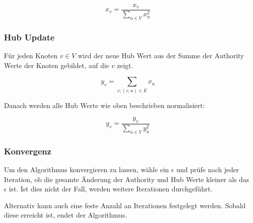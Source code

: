 \[ x_{v} =  \frac{x_{v}}{\sum_{u \in V} x_{u}^{2}} \]

\subsubsection{Hub Update}

Für jeden Knoten $ v \in V $ wird der neue Hub Wert aus der Summe der Authority Werte der Knoten gebildet, auf die $v$ zeigt.

\[ y_{v} = \sum_{v; (v, u) \in E} x_{u} \]

Danach werden alle Hub Werte wie oben beschrieben normalisiert:

\[ y_{v} =  \frac{y_{v}}{\sum_{u \in V} y_{u}^{2}} \]

\subsubsection{Konvergenz}

Um den Algorithmus konvergieren zu lassen, wähle ein $ \epsilon $ und prüfe nach jeder Iteration, ob die gesamte Änderung der Authority
und Hub Werte kleiner als das $ \epsilon $ ist. Ist dies nicht der Fall, werden weitere Iterationen durchgeführt.


Alternativ kann auch eine feste Anzahl an Iterationen festgelegt werden. Sobald diese erreicht ist, endet der Algorithmus.
